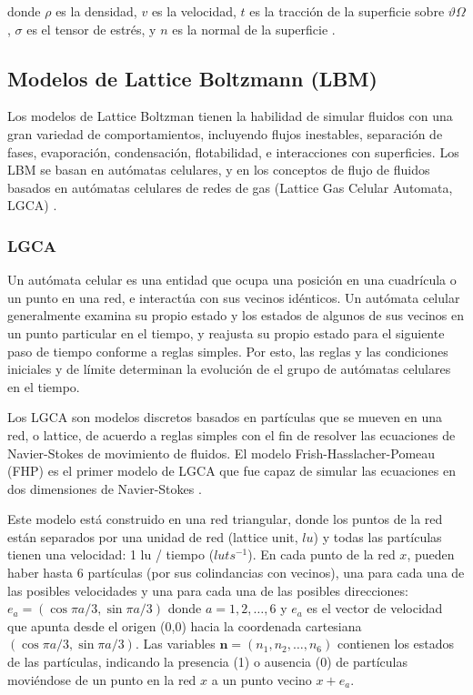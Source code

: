 donde $\rho$ es la densidad, $v$ es la velocidad, $t$ es la tracción de la superficie sobre $\vartheta\Omega$, $\sigma$ es el tensor de estrés, y $n$ es la normal de la superficie \citep{leveque2002finite}. 

\subsection{Modelos de Lattice Boltzmann (LBM)}

Los modelos de Lattice Boltzman tienen la habilidad de simular fluidos con una gran variedad de comportamientos, incluyendo flujos inestables, separación de fases, evaporación, condensación, flotabilidad, e interacciones con superficies. Los LBM se basan en autómatas celulares, y en los conceptos de flujo de fluidos basados en autómatas celulares de redes de gas (Lattice Gas Celular Automata, LGCA) \citep{sukop2006lattice}.

\subsubsection{LGCA}

Un autómata celular es una entidad que ocupa una posición en una cuadrícula o un punto en una red, e interactúa con sus vecinos idénticos. Un autómata celular generalmente examina su propio estado y los estados de algunos de sus vecinos en un punto particular en el tiempo, y reajusta su propio estado para el siguiente paso de tiempo conforme a reglas simples. Por esto, las reglas y las condiciones iniciales y de límite determinan la evolución de el grupo de autómatas celulares en el tiempo.

Los LGCA son modelos discretos basados en partículas que se mueven en una red, o lattice, de acuerdo a reglas simples con el fin de resolver las ecuaciones de Navier-Stokes de movimiento de fluidos. El modelo Frish-Hasslacher-Pomeau (FHP) es el primer modelo de LGCA que fue capaz de simular las ecuaciones en dos dimensiones de Navier-Stokes \citep{sukop2006lattice}.

Este modelo está construido en una red triangular, donde los puntos de la red están separados por una unidad de red (lattice unit, $lu$) y todas las partículas tienen una velocidad: 1 lu / tiempo ($lu ts^{-1}$). En cada punto de la red $x$, pueden haber hasta 6 partículas (por sus colindancias con vecinos), una para cada una de las posibles velocidades y una para cada una de las posibles direcciones: $e_a = (\cos \pi a/3, \sin \pi a/3)$ donde $a = 1,2,\dots,6$ y $e_a$ es el vector de velocidad que apunta desde el origen (0,0) hacia la coordenada cartesiana $(\cos \pi a/3, \sin \pi a/3)$. Las variables $\textbf{n} = (n_1, n_2, \dots, n_6)$ contienen los estados de las partículas, indicando la presencia (1) o ausencia (0) de partículas moviéndose de un punto en la red $x$ a un punto vecino $x + e_a$. 


